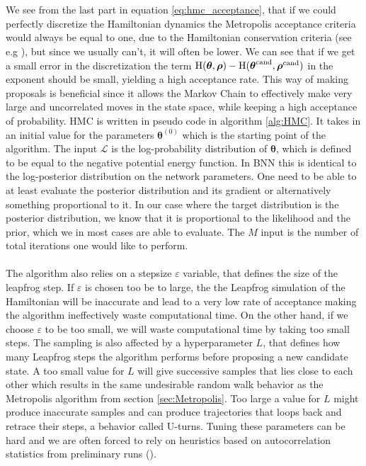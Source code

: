 \\ 
\\
We see from the last part in equation \ref{eq:hmc_acceptance}, that if we could perfectly discretize the Hamiltonian dynamics the Metropolis acceptance criteria would always be equal to one, due to the Hamiltonian conservation criteria (see e.g \cite{neal2012mcmc}), but since we usually can't, it will often be lower. We can see that if we get a small error in the discretization the term  $\operatorname{H}(\boldsymbol{\theta},\boldsymbol{\rho})-\operatorname{H}(\boldsymbol{\theta}^{\text{cand}},\boldsymbol{\rho}^{\text{cand}})$ in the exponent should be small, yielding a high acceptance rate. This way of making proposals is beneficial since it allows the Markov Chain to effectively make very large and uncorrelated moves in the state space, while keeping a high acceptance of probability. HMC is written in pseudo code in algorithm \ref{alg:HMC}. It takes in an initial value for the parameters $\boldsymbol{\theta}^{(0)}$ which is the starting point of the algorithm. The input $\mathcal{L}$ is the log-probability distribution of $\boldsymbol{\theta}$, which is defined to be equal to the negative potential energy function. In BNN this is identical to the log-posterior distribution on the network parameters. One need to be able to at least evaluate the posterior distribution and its gradient or alternatively something proportional to it. In our case where the target distribution is the posterior distribution, we know that it is proportional to the likelihood and the prior, which we in most cases are able to evaluate. The $M$ input is the number of total iterations one would like to perform.
\\
\\
The algorithm also relies on a stepsize $\varepsilon$ variable, that defines the size of the leapfrog step. If $\varepsilon$ is chosen too be to large, the the Leapfrog simulation of the Hamiltonian will be inaccurate and lead to a very low rate of acceptance making the algorithm ineffectively waste computational time. On the other hand, if we choose $\varepsilon$ to be too small, we will waste computational time by taking too small steps. The sampling is also affected by a hyperparameter $L$, that defines how many Leapfrog steps the algorithm performs before proposing a new candidate state. A too small value for $L$ will give successive samples that lies close to each other which results in the same undesirable random walk behavior as the Metropolis algorithm from section \ref{sec:Metropolis}. Too large a value for $L$ might produce inaccurate samples and can produce trajectories that loops back and retrace their steps, a behavior called U-turns. Tuning these parameters can be hard and we are often forced to rely on heuristics based on autocorrelation statistics from preliminary runs (\cite{neal2012mcmc}).
